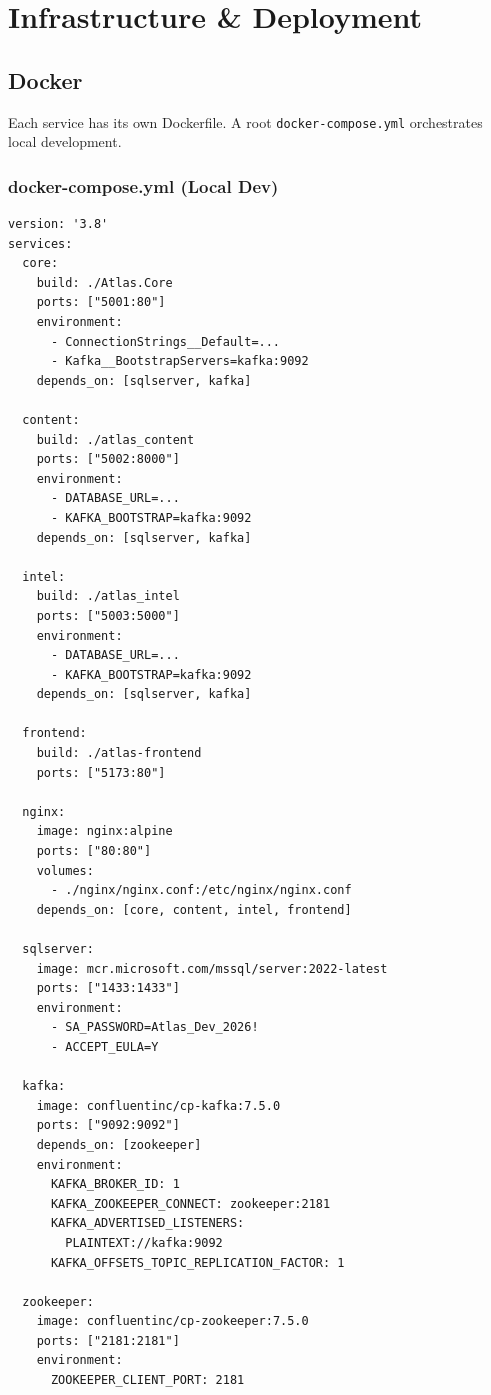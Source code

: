 \documentclass[12pt,letterpaper]{article}
\begin{document}
\newpage

\section{Infrastructure \& Deployment}

\subsection{Docker}
Each service has its own Dockerfile. A root \texttt{docker-compose.yml} orchestrates local development.

\subsubsection{docker-compose.yml (Local Dev)}
\begin{lstlisting}[style=code]
version: '3.8'
services:
  core:
    build: ./Atlas.Core
    ports: ["5001:80"]
    environment:
      - ConnectionStrings__Default=...
      - Kafka__BootstrapServers=kafka:9092
    depends_on: [sqlserver, kafka]

  content:
    build: ./atlas_content
    ports: ["5002:8000"]
    environment:
      - DATABASE_URL=...
      - KAFKA_BOOTSTRAP=kafka:9092
    depends_on: [sqlserver, kafka]

  intel:
    build: ./atlas_intel
    ports: ["5003:5000"]
    environment:
      - DATABASE_URL=...
      - KAFKA_BOOTSTRAP=kafka:9092
    depends_on: [sqlserver, kafka]

  frontend:
    build: ./atlas-frontend
    ports: ["5173:80"]

  nginx:
    image: nginx:alpine
    ports: ["80:80"]
    volumes:
      - ./nginx/nginx.conf:/etc/nginx/nginx.conf
    depends_on: [core, content, intel, frontend]

  sqlserver:
    image: mcr.microsoft.com/mssql/server:2022-latest
    ports: ["1433:1433"]
    environment:
      - SA_PASSWORD=Atlas_Dev_2026!
      - ACCEPT_EULA=Y

  kafka:
    image: confluentinc/cp-kafka:7.5.0
    ports: ["9092:9092"]
    depends_on: [zookeeper]
    environment:
      KAFKA_BROKER_ID: 1
      KAFKA_ZOOKEEPER_CONNECT: zookeeper:2181
      KAFKA_ADVERTISED_LISTENERS:
        PLAINTEXT://kafka:9092
      KAFKA_OFFSETS_TOPIC_REPLICATION_FACTOR: 1

  zookeeper:
    image: confluentinc/cp-zookeeper:7.5.0
    ports: ["2181:2181"]
    environment:
      ZOOKEEPER_CLIENT_PORT: 2181
\end{lstlisting}
\end{document}

